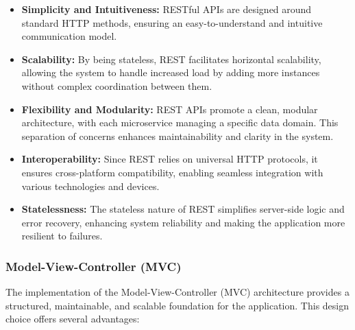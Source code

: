 \begin{itemize}
    \item \textbf{Simplicity and Intuitiveness:} RESTful APIs are designed around standard HTTP methods, ensuring an easy-to-understand and intuitive communication model.
    \item \textbf{Scalability:} By being stateless, REST facilitates horizontal scalability, allowing the system to handle increased load by adding more instances without complex coordination between them.
    \item \textbf{Flexibility and Modularity:} REST APIs promote a clean, modular architecture, with each microservice managing a specific data domain. This separation of concerns enhances maintainability and clarity in the system.
    \item \textbf{Interoperability:} Since REST relies on universal HTTP protocols, it ensures cross-platform compatibility, enabling seamless integration with various technologies and devices.
    \item \textbf{Statelessness:} The stateless nature of REST simplifies server-side logic and error recovery, enhancing system reliability and making the application more resilient to failures.
\end{itemize}

\subsubsection{Model-View-Controller (MVC)}

The implementation of the Model-View-Controller (MVC) architecture provides a structured, maintainable, and scalable foundation for the application. This design choice offers several advantages:

